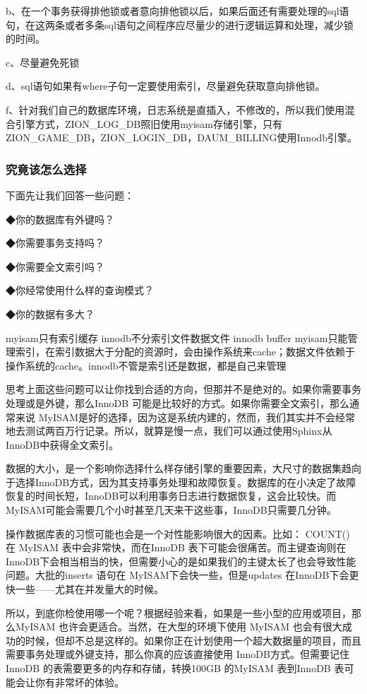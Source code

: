 \documentclass[UTF8]{ctexart}
\begin{document}
b、在一个事务获得排他锁或者意向排他锁以后，如果后面还有需要处理的sql语句，在这两条或者多条sql语句之间程序应尽量少的进行逻辑运算和处理，减少锁的时间。

c、尽量避免死锁

d、sql语句如果有where子句一定要使用索引，尽量避免获取意向排他锁。

f、针对我们自己的数据库环境，日志系统是直插入，不修改的，所以我们使用混合引擎方式，ZION\_LOG\_DB照旧使用myisam存储引擎，只有ZION\_GAME\_DB，ZION\_LOGIN\_DB，DAUM\_BILLING使用Innodb引擎。

\subsubsection{究竟该怎么选择}

下面先让我们回答一些问题：   

◆你的数据库有外键吗？   

◆你需要事务支持吗？   

◆你需要全文索引吗？   

◆你经常使用什么样的查询模式？   

◆你的数据有多大？   
  
myisam只有索引缓存   
innodb不分索引文件数据文件 innodb buffer   
myisam只能管理索引，在索引数据大于分配的资源时，会由操作系统来cache；数据文件依赖于操作系统的cache。innodb不管是索引还是数据，都是自己来管理  
  
思考上面这些问题可以让你找到合适的方向，但那并不是绝对的。如果你需要事务处理或是外键，那么InnoDB 可能是比较好的方式。如果你需要全文索引，那么通常来说 MyISAM是好的选择，因为这是系统内建的，然而，我们其实并不会经常地去测试两百万行记录。所以，就算是慢一点，我们可以通过使用Sphinx从InnoDB中获得全文索引。  
  
数据的大小，是一个影响你选择什么样存储引擎的重要因素，大尺寸的数据集趋向于选择InnoDB方式，因为其支持事务处理和故障恢复。数据库的在小决定了故障恢复的时间长短，InnoDB可以利用事务日志进行数据恢复，这会比较快。而MyISAM可能会需要几个小时甚至几天来干这些事，InnoDB只需要几分钟。  
  
操作数据库表的习惯可能也会是一个对性能影响很大的因素。比如： COUNT() 在 MyISAM 表中会非常快，而在InnoDB 表下可能会很痛苦。而主键查询则在InnoDB下会相当相当的快，但需要小心的是如果我们的主键太长了也会导致性能问题。大批的inserts 语句在 MyISAM下会快一些，但是updates 在InnoDB下会更快一些——尤其在并发量大的时候。  
  
所以，到底你检使用哪一个呢？根据经验来看，如果是一些小型的应用或项目，那么MyISAM 也许会更适合。当然，在大型的环境下使用 MyISAM 也会有很大成功的时候，但却不总是这样的。如果你正在计划使用一个超大数据量的项目，而且需要事务处理或外键支持，那么你真的应该直接使用 InnoDB方式。但需要记住InnoDB 的表需要更多的内存和存储，转换100GB 的MyISAM 表到InnoDB 表可能会让你有非常坏的体验。  
  
\end{document}
